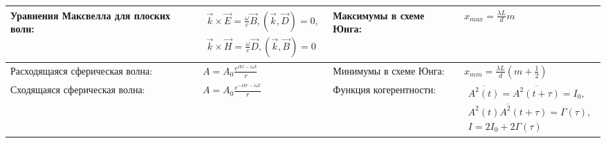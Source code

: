 \documentclass{article}
\begin{document}
\begin{tabular}{ |p{4.1cm}|p{5.4cm}|p{3.9cm}|p{5.6cm}|  }
\hline
Уравнения Максвелла для плоских волн:                                        &  %
$\begin{aligned}
\vec{k} \times \vec{E} = \frac{\omega}{c} \vec{B}, (\vec{k}, \vec{D}) = 0, \\
\vec{k} \times \vec{H} = \frac{\omega}{c} \vec{D}, (\vec{k}, \vec{B}) = 0
\end{aligned}$                                                               &  %
Максимумы в схеме Юнга:                                                      &  %
$x_{max} = \frac{\lambda L}{d} m$                                            \\ %
\hline
Расходящаяся сферическая волна:                                              &  %
$A = A_0 \frac{e^{i k r-i \omega t}}{r}$                                     &  %
Минимумы в схеме Юнга:                                                       &  %
$x_{min} = \frac{\lambda L}{d} (m + \frac{1}{2})$                                                                             \\ %
\hline
Сходящаяся сферическая волна:                                                &  %
$A = A_0 \frac{e^{-i k r-i \omega t}}{r}$                                    &  %
Функция когерентности:                                                       &  %
$\begin{aligned}
\overline{A^2(t)} = \overline{A^2(t+\tau)} = I_0, \\
\overline{A^2(t) A^2(t+\tau)} = \Gamma(\tau),     \\
I = 2 I_0 + 2 \Gamma(\tau)
\end{aligned}$                                                               \\ %
\hline
\end{tabular}

\newpage
\end{document}
